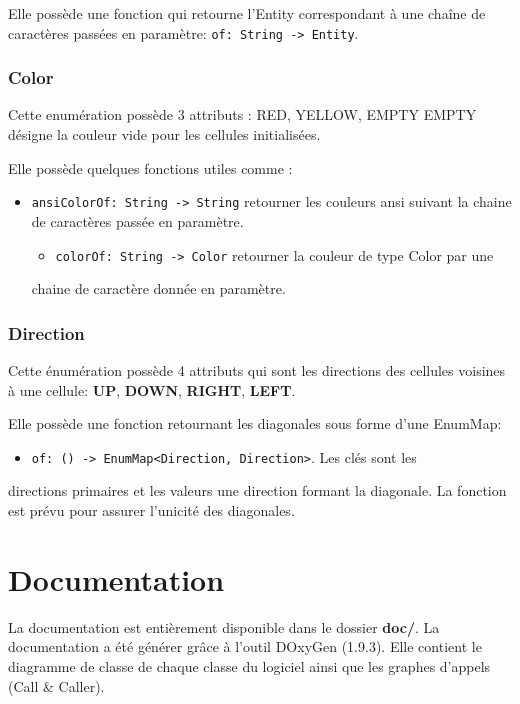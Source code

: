 \documentclass[11pt]{article}
\begin{document}
Elle possède une fonction qui retourne l'Entity correspondant à une
chaîne de caractères passées en paramètre: \texttt{of: String -> Entity}.

\subsubsection{Color\label{orgc449396}}
\label{sec:orga264443}

Cette enumération possède 3 attributs : RED, YELLOW, EMPTY
EMPTY désigne la couleur vide pour les cellules initialisées.

Elle possède quelques fonctions utiles comme :

\begin{itemize}
\item \texttt{ansiColorOf: String -> String} retourner les couleurs ansi suivant la
chaine de caractères passée en paramètre.
\begin{itemize}
\item \texttt{colorOf: String -> Color} retourner la couleur de type Color par une
\end{itemize}
chaine de caractère donnée en paramètre.
\end{itemize}

\subsubsection{Direction\label{org149a95e}}
\label{sec:orgd2ff209}

Cette énumération possède 4 attributs qui sont les directions des
cellules voisines à une cellule: \textbf{UP}, \textbf{DOWN}, \textbf{RIGHT}, \textbf{LEFT}.

Elle possède une fonction retournant les diagonales sous forme d'une
EnumMap:

\begin{itemize}
\item \texttt{of: () -> EnumMap<Direction, Direction>}. Les clés sont les
\end{itemize}
directions primaires et les valeurs une direction formant la
diagonale. La fonction est prévu pour assurer l'unicité des diagonales.

\section{Documentation\label{org29fdec9}}
\label{sec:org900457b}

La documentation est entièrement disponible dans le dossier \textbf{doc/}. La
documentation a été générer grâce à l'outil DOxyGen (1.9.3). Elle contient le
diagramme de classe de chaque classe du logiciel ainsi que les graphes
d'appels (Call \& Caller). 
\end{document}
